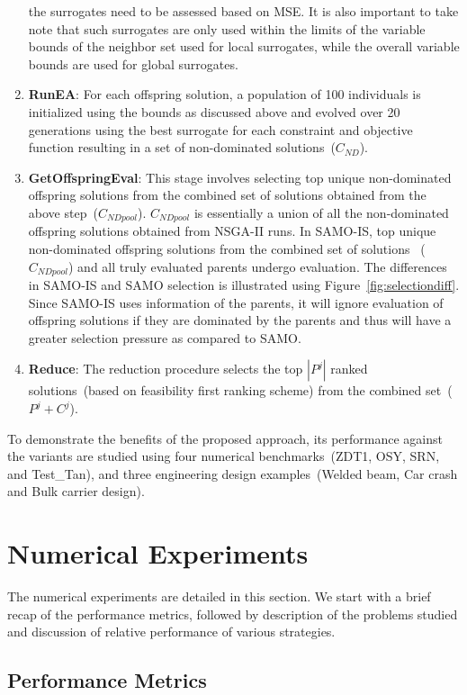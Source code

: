 \begin{enumerate}
	the surrogates need to be assessed based on MSE. It is also important to take note that such surrogates are only used
	within the limits of the variable bounds of the neighbor set used for local surrogates, while the
	overall variable bounds are used for global surrogates. 
	\item \textbf{RunEA}: For each offspring
	solution, a population of 100 individuals is initialized using the bounds as discussed above and
	evolved over 20 generations using the best surrogate for each constraint and objective function
	resulting in a set of non-dominated solutions~($C_{ND}$). \item \textbf{GetOffspringEval}: This 
	stage involves selecting top unique non-dominated offspring solutions from the combined set 
	of solutions obtained from the above step~($C_{NDpool}$). $C_{NDpool}$ is essentially a union of 
	all the non-dominated offspring solutions obtained from NSGA-II runs. In SAMO-IS, top unique non-dominated 
	offspring solutions from the combined set of solutions ~($C_{NDpool}$) and all truly evaluated parents 
	undergo evaluation. The differences in SAMO-IS and SAMO selection is 
	illustrated using Figure~\ref{fig:selectiondiff}. Since SAMO-IS uses information of the parents, it will ignore 
	evaluation of offspring solutions if they are dominated by the parents and thus will have a greater selection
	pressure as compared to SAMO.
	\item
	\textbf{Reduce}: The reduction procedure selects the top $\left|P^j\right|$ ranked solutions~(based
	on feasibility first ranking scheme) from the combined set~($P^j + C^j$). \end{enumerate}

To demonstrate the benefits of the proposed approach, its performance against the variants are
studied using four numerical benchmarks~(ZDT1, OSY, SRN, and Test\_Tan), and three engineering
design examples~(Welded beam, Car crash and Bulk carrier design).

\section{Numerical Experiments} \label{sec:results} The numerical experiments are detailed in this
section. We start with a brief recap of the performance metrics, followed by description of the
problems studied and discussion of relative performance of various strategies.

\subsection{Performance Metrics}

